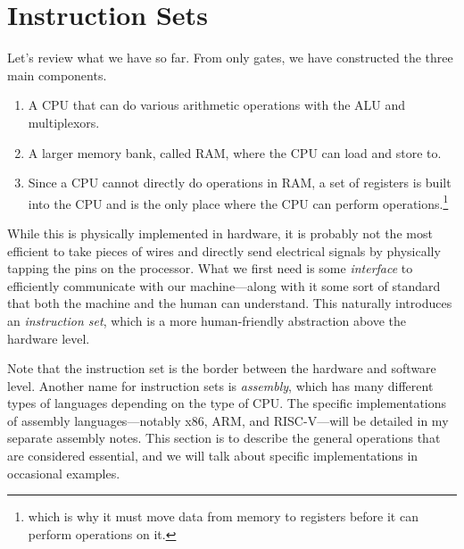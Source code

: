 \section{Instruction Sets} 
  
  Let's review what we have so far. From only gates, we have constructed the three main components. 
  \begin{enumerate}
    \item A CPU that can do various arithmetic operations with the ALU and multiplexors. 
    \item A larger memory bank, called RAM, where the CPU can load and store to. 
    \item Since a CPU cannot directly do operations in RAM, a set of registers is built into the CPU and is the only place where the CPU can perform operations.\footnote{which is why it must move data from memory to registers before it can perform operations on it.}
  \end{enumerate}

  While this is physically implemented in hardware, it is probably not the most efficient to take pieces of wires and directly send electrical signals by physically tapping the pins on the processor. What we first need is some \textit{interface} to efficiently communicate with our machine---along with it some sort of standard that both the machine and the human can understand. This naturally introduces an \textit{instruction set}, which is a more human-friendly abstraction above the hardware level. 

  Note that the instruction set is the border between the hardware and software level. Another name for instruction sets is \textit{assembly}, which has many different types of languages depending on the type of CPU. The specific implementations of assembly languages---notably x86, ARM, and RISC-V---will be detailed in my separate assembly notes. This section is to describe the general operations that are considered essential, and we will talk about specific implementations in occasional examples. 

